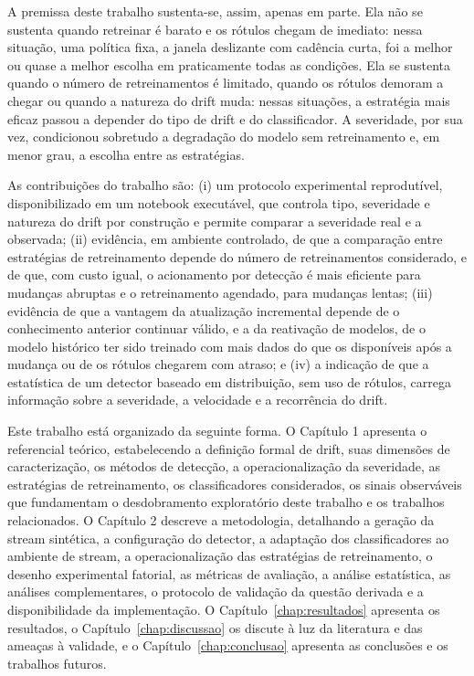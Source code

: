 A premissa deste trabalho sustenta-se, assim, apenas em parte. Ela não se
sustenta quando retreinar é barato e os rótulos chegam de imediato: nessa
situação, uma política fixa, a janela deslizante com cadência curta, foi a
melhor ou quase a melhor escolha em praticamente todas as condições. Ela se
sustenta quando o número de retreinamentos é limitado, quando os rótulos
demoram a chegar ou quando a natureza do drift muda: nessas situações, a
estratégia mais eficaz passou a depender do tipo de drift e do
classificador. A severidade, por sua vez, condicionou sobretudo a
degradação do modelo sem retreinamento e, em menor grau, a escolha entre as
estratégias.

As contribuições do trabalho são: (i) um protocolo experimental
reprodutível, disponibilizado em um notebook executável, que controla tipo,
severidade e natureza do drift por construção e permite comparar a
severidade real e a observada; (ii) evidência, em ambiente controlado, de
que a comparação entre estratégias de retreinamento depende do número de
retreinamentos considerado, e de que, com custo igual, o acionamento por
detecção é mais eficiente para mudanças abruptas e o retreinamento
agendado, para mudanças lentas; (iii) evidência de que a vantagem da
atualização incremental depende de o conhecimento anterior continuar válido,
e a da reativação de modelos, de o modelo histórico ter sido treinado com
mais dados do que os disponíveis após a mudança ou de os rótulos chegarem
com atraso; e (iv) a indicação de que a estatística de um detector baseado
em distribuição, sem uso de rótulos, carrega informação sobre a severidade,
a velocidade e a recorrência do drift.

Este trabalho está organizado da seguinte forma. O Capítulo 1
apresenta o referencial teórico,
estabelecendo a definição formal de drift, suas dimensões de caracterização,
os métodos de detecção, a operacionalização da severidade, as estratégias de
retreinamento, os classificadores considerados, os sinais observáveis que
fundamentam o desdobramento exploratório deste trabalho e os trabalhos
relacionados. O Capítulo 2 descreve a metodologia, detalhando a geração da
stream sintética, a configuração do detector, a adaptação dos
classificadores ao ambiente de stream, a operacionalização das estratégias
de retreinamento, o desenho experimental fatorial, as métricas de avaliação,
a análise estatística, as análises complementares, o protocolo de validação
da questão derivada e a disponibilidade da implementação. O
Capítulo~\ref{chap:resultados} apresenta os resultados, o
Capítulo~\ref{chap:discussao} os discute à luz da literatura e das ameaças à
validade, e o Capítulo~\ref{chap:conclusao} apresenta as conclusões e os
trabalhos futuros.
